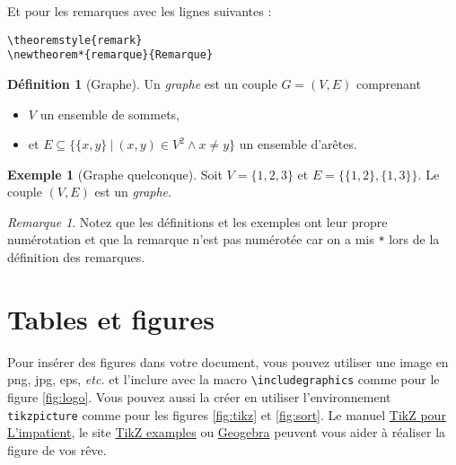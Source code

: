 \documentclass{rapport}
\def\etc{\textit{etc.}\xspace}
\begin{document}
      Et pour les remarques avec les lignes suivantes : 
      
      \begin{verbatim}
\theoremstyle{remark}
\newtheorem*{remarque}{Remarque}\end{verbatim}
            
      \theoremstyle{definition}
      \newtheorem{definition}{Définition}
      \newtheorem{exemple}{Exemple}
      \theoremstyle{remark}
      \newtheorem*{remarque}{Remarque}
      
      \begin{definition}[Graphe]
        Un \emph{graphe} est un couple $G = (V, E)$ comprenant
        \begin{itemize}
          \item $V$ un ensemble de sommets, 
          \item et $E \subseteq \{\{x, y\}\ |\ (x, y) \in V^2 \wedge x \neq y\}$ un ensemble d'arêtes.
        \end{itemize}
      \end{definition}
      
      \begin{exemple}[Graphe quelconque]
        Soit $V = \{1, 2, 3\}$ et $E = \{\{1, 2\}, \{1, 3\}\}$. Le couple $(V, E)$ est un \emph{graphe}.
      \end{exemple}
      
      \begin{remarque}
        Notez que les définitions et les exemples ont leur propre numérotation et que la remarque n'est pas numérotée car on a mis \verb|*| lors de la définition des remarques.
      \end{remarque}

    \section{Tables et figures\label{sec:tabfig}}

      Pour insérer des figures dans votre document, vous pouvez utiliser une image en png, jpg, eps, \etc et l'inclure avec la macro \verb|\includegraphics| comme pour le figure \ref{fig:logo}. Vous pouvez aussi la créer en utiliser l'environnement \verb|tikzpicture| comme pour les figures \ref{fig:tikz} et \ref{fig:sort}. Le manuel \href{http://math.et.info.free.fr/TikZ/}{TikZ pour L'impatient}, le site \href{https://texample.net/tikz/examples/}{TikZ examples} ou \href{https://www.geogebra.org/}{Geogebra} peuvent vous aider à réaliser la figure de vos rêve.
      
\end{document}
